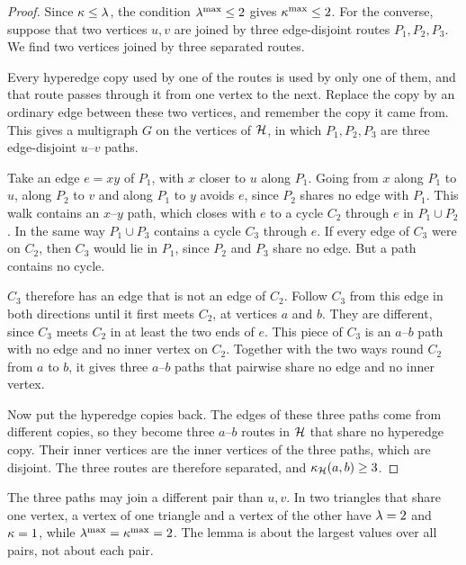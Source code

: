 \begin{proof}
Since $\kappa \le \lambda$, the condition $\lambda^{\max} \le 2$ gives $\kappa^{\max} \le 2$.
For the converse, suppose that two vertices $u,v$ are joined by three edge-disjoint routes $P_1, P_2, P_3$. We find two vertices joined by three separated routes.

Every hyperedge copy used by one of the routes is used by only one of them, and that route passes through it from one vertex to the next.
Replace the copy by an ordinary edge between these two vertices, and remember the copy it came from.
This gives a multigraph $G$ on the vertices of $\mathcal{H}$, in which $P_1, P_2, P_3$ are three edge-disjoint $u$--$v$ paths.

Take an edge $e = xy$ of $P_1$, with $x$ closer to $u$ along $P_1$.
Going from $x$ along $P_1$ to $u$, along $P_2$ to $v$ and along $P_1$ to $y$ avoids $e$, since $P_2$ shares no edge with $P_1$.
This walk contains an $x$--$y$ path, which closes with $e$ to a cycle $C_2$ through $e$ in $P_1 \cup P_2$.
In the same way $P_1 \cup P_3$ contains a cycle $C_3$ through $e$.
If every edge of $C_3$ were on $C_2$, then $C_3$ would lie in $P_1$, since $P_2$ and $P_3$ share no edge. But a path contains no cycle.

$C_3$ therefore has an edge that is not an edge of $C_2$.
Follow $C_3$ from this edge in both directions until it first meets $C_2$, at vertices $a$ and $b$. They are different, since $C_3$ meets $C_2$ in at least the two ends of $e$.
This piece of $C_3$ is an $a$--$b$ path with no edge and no inner vertex on $C_2$.
Together with the two ways round $C_2$ from $a$ to $b$, it gives three $a$--$b$ paths that pairwise share no edge and no inner vertex.

Now put the hyperedge copies back. The edges of these three paths come from different copies, so they become three $a$--$b$ routes in $\mathcal{H}$ that share no hyperedge copy.
Their inner vertices are the inner vertices of the three paths, which are disjoint.
The three routes are therefore separated, and $\kappa_{\mathcal{H}}(a,b) \ge 3$.
\end{proof}

The three paths may join a different pair than $u,v$.
In two triangles that share one vertex, a vertex of one triangle and a vertex of the other have $\lambda = 2$ and $\kappa = 1$, while $\lambda^{\max} = \kappa^{\max} = 2$.
The lemma is about the largest values over all pairs, not about each pair.

